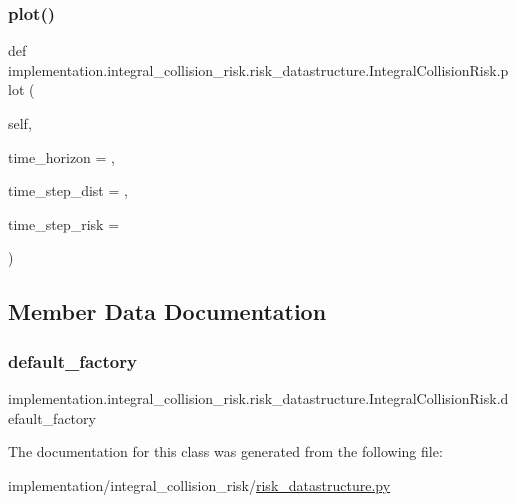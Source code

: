 \subsubsection{\texorpdfstring{plot()}{plot()}}
{\footnotesize\ttfamily def implementation.\+integral\+\_\+collision\+\_\+risk.\+risk\+\_\+datastructure.\+Integral\+Collision\+Risk.\+plot (\begin{DoxyParamCaption}\item[{}]{self,  }\item[{}]{time\+\_\+horizon = {},  }\item[{}]{time\+\_\+step\+\_\+dist = {},  }\item[{}]{time\+\_\+step\+\_\+risk = {} }\end{DoxyParamCaption})}



\subsection{Member Data Documentation}
\mbox{\label{classimplementation_1_1integral__collision__risk_1_1risk__datastructure_1_1_integral_collision_risk_a24949b7fedd335e556517f423b76eb64}} 
\subsubsection{\texorpdfstring{default\+\_\+factory}{default\_factory}}
{\footnotesize\ttfamily implementation.\+integral\+\_\+collision\+\_\+risk.\+risk\+\_\+datastructure.\+Integral\+Collision\+Risk.\+default\+\_\+factory\hspace{0.3cm}{\ttfamily [static]}}



The documentation for this class was generated from the following file\+:\begin{DoxyCompactItemize}
\item 
implementation/integral\+\_\+collision\+\_\+risk/\hyperlink{risk__datastructure_8py}{risk\+\_\+datastructure.\+py}\end{DoxyCompactItemize}
